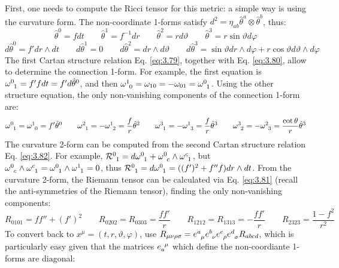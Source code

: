 First, one needs to compute the Ricci tensor for this metric: a simple way is using the curvature form. The non-coordinate 1-forms satisfy $ d^2 = \eta_{ab} \hat{\theta}^a \otimes \hat{\theta}^b $, thus:
\begin{equation*}
  \hat{\theta}^0 = f dt
  \qquad
  \hat{\theta}^1 = f^{-1} dr
  \qquad
  \hat{\theta}^2 = r d\vartheta
  \qquad
  \hat{\theta}^3 = r \sin \vartheta d\varphi
\end{equation*}
\begin{equation*}
  d\hat{\theta}^0 = f' dr \wedge dt
  \qquad
  d\hat{\theta}^1 = 0
  \qquad
  d\hat{\theta}^2 = dr \wedge d\vartheta
  \qquad
  d\hat{\theta}^3 = \sin \vartheta dr \wedge d\varphi + r \cos \vartheta d\vartheta \wedge d\varphi
\end{equation*}
The first Cartan structure relation Eq. \ref{eq:3.79}, together with Eq. \ref{eq:3.80}, allow to determine the connection 1-form. For example, the first equation is $ \tensor{\omega}{^0_1} = f' f dt = f' d\hat{\theta}^0 $, and then $ \tensor{\omega}{^1_0} = \omega_{10} = - \omega_{01} = \tensor{\omega}{^0_1} $. Using the other structure equation, the only non-vanishing components of the connection 1-form are:
\begin{equation*}
  \tensor{\omega}{^0_1} = \tensor{\omega}{^1_0} = f' \hat{\theta}^0
  \qquad
  \tensor{\omega}{^2_1} = - \tensor{\omega}{^1_2} = \frac{f}{r} \hat{\theta}^2
  \qquad
  \tensor{\omega}{^3_1} = - \tensor{\omega}{^1_3} = \frac{f}{r} \hat{\theta}^3
  \qquad
  \tensor{\omega}{^3_2} = - \tensor{\omega}{^2_3} = \frac{\cot \theta}{r} \hat{\theta}^3
\end{equation*}
The curvature 2-form can be computed from the second Cartan structure relation Eq. \ref{eq:3.82}. For example, $ \tensor{\mathcal{R}}{^0_1} = d\tensor{\omega}{^0_1} + \tensor{\omega}{^0_c} \wedge \tensor{\omega}{^c_1} $, but $ \tensor{\omega}{^0_c} \wedge \tensor{\omega}{^c_1} = \tensor{\omega}{^0_1} \wedge \tensor{\omega}{^1_1} = 0 $, thus $ \tensor{\mathcal{R}}{^0_1} = d\tensor{\omega}{^0_1} = ( (f')^2 + f'' f) dr \wedge dt $. From the curvature 2-form, the Riemann tensor can be calculated via Eq. \ref{eq:3.81} (recall the anti-symmetries of the Riemann tensor), finding the only non-vanishing components:
\begin{equation*}
  R_{0101} = f f'' + (f')^2
  \qquad
  R_{0202} = R_{0303} = \frac{f f'}{r}
  \qquad
  R_{1212} = R_{1313} = - \frac{f f'}{r}
  \qquad
  R_{2323} = \frac{1 - f^2}{r^2}
\end{equation*}
To convert back to $ x^\mu = (t,r,\vartheta,\varphi) $, use $ R_{\mu \nu \rho \sigma} = \tensor{e}{^a_\mu} \tensor{e}{^b_\nu} \tensor{e}{^c_\rho} \tensor{e}{^d_\sigma} R_{abcd} $, which is particularly easy given that the matrices $ \tensor{e}{_a^\mu} $ which define the non-coordiante 1-forms are diagonal:
